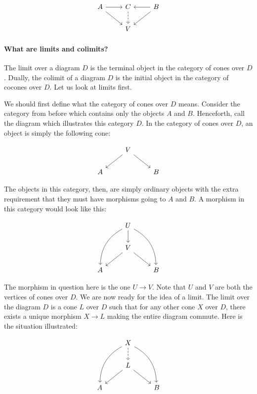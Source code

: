 \documentclass{article}
\begin{document}
\[
  \begin{tikzcd}
    A \arrow[r] \arrow[rd] & C \arrow[d, dashed] & B \arrow[l] \arrow[ld] \\
                           & V                   &
  \end{tikzcd}
\]

\paragraph{What are limits and colimits?}

The limit over a diagram \(D\) is the terminal object in the category of cones
over \(D\). Dually, the colimit of a diagram \(D\) is the initial object in the
category of cocones over \(D\). Let us look at limits first.

We should first define what the category of cones over \(D\) means. Consider
the category from before which contains only the objects \(A\) and \(B\).
Henceforth, call the diagram which illustrates this category \(D\). In the
category of cones over \(D\), an object is simply the following cone:

\[
  \begin{tikzcd}
      & V \arrow[ld] \arrow[rd] &   \\
    A &                         & B
  \end{tikzcd}
\]

The objects in this category, then, are simply ordinary objects with the extra
requirement that they must have morphisms going to \(A\) and \(B\). A morphism
in this category would look like this:

\[
  \begin{tikzcd}
      & U \arrow[ldd, bend right] \arrow[rdd, bend left] \arrow[d] &   \\
      & V \arrow[ld] \arrow[rd]                                    &   \\
    A &                                                            & B
  \end{tikzcd}
\]

The morphism in question here is the one \(U \to V\). Note that \(U\) and \(V\)
are both the vertices of cones over \(D\). We are now ready for the idea of a
limit. The limit over the diagram \(D\) is a cone \(L\) over \(D\) such that
for any other cone \(X\) over \(D\), there exists a unique morphism \(X \to L\)
making the entire diagram commute. Here is the situation illustrated:

\[
  \begin{tikzcd}
      & X \arrow[ldd, bend right] \arrow[rdd, bend left] \arrow[d, dashed] &   \\
      & L \arrow[ld] \arrow[rd]                                            &   \\
    A &                                                                    & B
  \end{tikzcd}
\]
\end{document}
